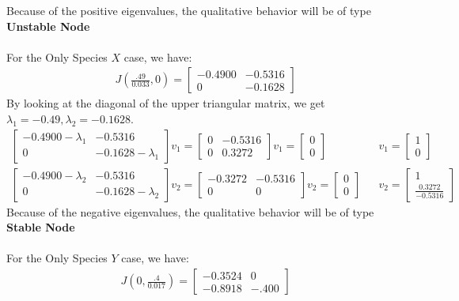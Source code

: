 \documentclass[12pt]{article}
\begin{document}
Because of the positive eigenvalues, the qualitative behavior will be of type \textbf{Unstable Node}
\\ \\
For the Only Species $X$ case, we have:
\begin{align*}
J\left(\frac{.49}{0.033},0\right)= 
\begin{bmatrix}
-0.4900 & -0.5316 \\
0 & -0.1628
\end{bmatrix}
\end{align*}
By looking at the diagonal of the upper triangular matrix, we get $\lambda_1 = -0.49, \lambda_2 = -0.1628$.
	\begin{align*}
\begin{bmatrix}
-0.4900 - \lambda_1 & -0.5316 \\
0 & -0.1628 - \lambda_1
\end{bmatrix}v_1 = 
\begin{bmatrix}
0 &  -0.5316 \\
0 &   0.3272
\end{bmatrix}v_1 = 
\begin{bmatrix}
0 \\ 0
\end{bmatrix} && 
v_1 = 
\begin{bmatrix}
1 \\ 0
\end{bmatrix} \\
\begin{bmatrix}
-0.4900 - \lambda_2 & -0.5316 \\
0 & -0.1628 - \lambda_2
\end{bmatrix}v_2 = 
\begin{bmatrix}
-0.3272  & -0.5316 \\
0 & 0
\end{bmatrix}v_2 = 
\begin{bmatrix}
0 \\ 0
\end{bmatrix} && 
v_2 = 
\begin{bmatrix}
1 \\ \frac{0.3272}{-0.5316}
\end{bmatrix}
\end{align*}	
Because of the negative eigenvalues, the qualitative behavior will be of type \textbf{Stable Node}
\\ \\
For the Only Species $Y$ case, we have:
\begin{align*}
J\left(0,\frac{.4}{0.017}\right)= 
\begin{bmatrix}
-0.3524 & 0 \\
-0.8918 & -.400
\end{bmatrix}
\end{align*}
\end{document}
